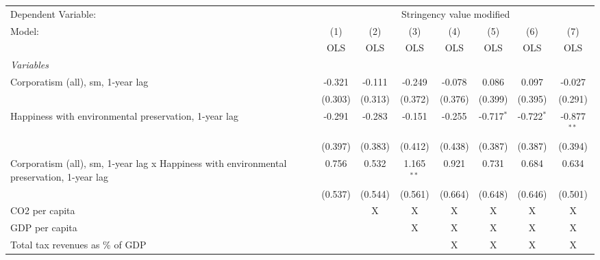 
\begingroup
\centering
\begin{tabular}{lccccccc}
   \toprule
   Dependent Variable: & \multicolumn{7}{c}{Stringency value modified}\\
   Model:                                                                                    & (1)     & (2)     & (3)          & (4)     & (5)          & (6)          & (7)\\  
                                                                                             &  OLS    & OLS     & OLS          & OLS     & OLS          & OLS          & OLS\\  
   \midrule
   \emph{Variables}\\
   Corporatism (all), sm, 1-year lag                                                         & -0.321  & -0.111  & -0.249       & -0.078  & 0.086        & 0.097        & -0.027\\   
                                                                                             & (0.303) & (0.313) & (0.372)      & (0.376) & (0.399)      & (0.395)      & (0.291)\\   
   Happiness with environmental preservation, 1-year lag                                     & -0.291  & -0.283  & -0.151       & -0.255  & -0.717$^{*}$ & -0.722$^{*}$ & -0.877$^{**}$\\   
                                                                                             & (0.397) & (0.383) & (0.412)      & (0.438) & (0.387)      & (0.387)      & (0.394)\\   
   Corporatism (all), sm, 1-year lag x Happiness with environmental preservation, 1-year lag & 0.756   & 0.532   & 1.165$^{**}$ & 0.921   & 0.731        & 0.684        & 0.634\\   
                                                                                             & (0.537) & (0.544) & (0.561)      & (0.664) & (0.648)      & (0.646)      & (0.501)\\   
   CO2 per capita                                                                            &         & X       & X            & X       & X            & X            & X\\  
   GDP per capita                                                                            &         &         & X            & X       & X            & X            & X\\  
   Total tax revenues as \% of GDP                                                           &         &         &              & X       & X            & X            & X\\  

\end{tabular}
